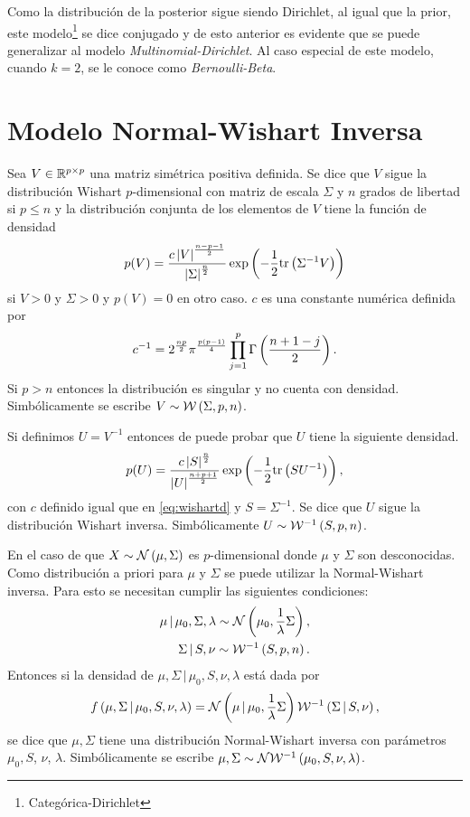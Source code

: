 Como la distribución de la posterior sigue siendo Dirichlet, al igual que la prior, este %
modelo\footnote{Categórica-Dirichlet} se dice conjugado y de esto anterior es evidente que %
se puede generalizar al modelo \textit{Multinomial-Dirichlet}. Al caso especial de este modelo, %
cuando $k = 2$, se le conoce como \textit{Bernoulli-Beta}.


\section{Modelo Normal-Wishart Inversa}

Sea $V \in \mathbb{R}^{p \times p}$ una matriz simétrica positiva definida. Se dice que $V$ sigue la%
distribución Wishart $p$-dimensional con matriz de escala $\Sigma$ y $n$ grados de libertad si %
$p \leq n$ y la distribución conjunta de los elementos de $V$ tiene la función de densidad %
\begin{equation}\label{eq:wishartd}
p(V) = \frac{c \abs{V}^{\frac{n - p - 1}{2}}}{\abs{\Sigma}^{\frac{n}{2}}} \exp\Pp{-\frac{1}{2}%
\tr{\Sigma^{-1} V}}
\end{equation}
si $V > 0$ y $\Sigma > 0$ y $p(V) = 0$ en otro caso. $c$ es una constante numérica definida por 
\[
c^{-1} = 2^{\frac{np}{2}} \pi^{\frac{p \Pp{p - 1}}{4}} \prod_{j = 1}^{p} \Gamma \Pp{\frac{n + 1 %
- j}{2}}.
\]
Si $p > n$ entonces la distribución es singular y no cuenta con densidad. Simbólicamente se %
escribe $V \sim \mathcal{W}\left( \Sigma, p, n \right)$.

Si definimos $U = V^{-1}$ entonces de puede probar que $U$ tiene la siguiente densidad.
\begin{equation}
p(U) = \frac{c \left| S \right|^{\frac{n}{2}}}{\left| U \right|^{\frac{n + p + 1}{2}}} \exp\left( -\frac{1}{2} \mathrm{tr} \left( S U^{-1} \right) \right),
\end{equation}
con $c$ definido igual que en \eqref{eq:wishartd} y $S = \Sigma^{-1}$. Se dice que $U$ sigue la %
distribución Wishart inversa. Simbólicamente $U \sim \mathcal{W}^{-1}\left( S, p, n \right)$.

En el caso de que $X \sim \mathcal{N}\left( \mu, \Sigma \right)$ es $p$-dimensional donde $\mu$ y $\Sigma$ son desconocidas. %
Como distribución a priori para $\mu$ y $\Sigma$ se puede %
utilizar la Normal-Wishart inversa. Para esto se necesitan cumplir las siguientes condiciones:
\begin{eqnarray}
\mu \,|\, \mu_{0}, \Sigma, \lambda \sim \mathcal{N}\left( \mu_{0}, \frac{1}{\lambda} \Sigma \right), \\
\Sigma \,|\, S, \nu \sim \mathcal{W}^{-1}\left( S, p, n \right).
\end{eqnarray}
Entonces si la densidad de $\mu, \Sigma \,|\, \mu_{0}, S, \nu, \lambda$ está dada por
\[
f\Pp{\mu, \Sigma \,|\, \mu_{0}, S, \nu, \lambda} = \Nor\Pp{\mu \,|\, \mu_{0}, \frac{1}{\lambda} \Sigma} \iWis %
\Pp{\Sigma \,|\, S, \nu},
\]
se dice que $\mu, \Sigma$ tiene una distribución Normal-Wishart inversa con parámetros $\mu_{0}, S$, $\nu$, $\lambda$. %
Simbólicamente se escribe $\mu, \Sigma \sim \mathcal{N}\mathcal{W}^{-1}\left( \mu_{0}, S, \nu, \lambda \right)$.

